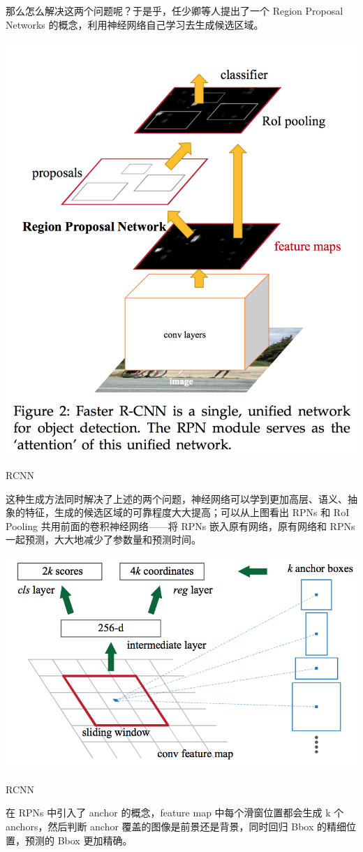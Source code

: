 那么怎么解决这两个问题呢？于是乎，任少卿等人提出了一个 Region Proposal Networks 的概念，利用神经网络自己学习去生成候选区域。
\begin{uscfigure}
	\includegraphics[width=\textwidth]{./Pictures/faster_rcnn.png}	
	\caption{RCNN}	
\end{uscfigure}
这种生成方法同时解决了上述的两个问题，神经网络可以学到更加高层、语义、抽象的特征，生成的候选区域的可靠程度大大提高；可以从上图看出 RPNs 和 RoI Pooling 共用前面的卷积神经网络——将 RPNs 嵌入原有网络，原有网络和 RPNs 一起预测，大大地减少了参数量和预测时间。
\begin{uscfigure}
	\includegraphics[width=\textwidth]{./Pictures/faster_rcnn_anchor.png}	
	\caption{RCNN}	
\end{uscfigure}
在 RPNs 中引入了 anchor 的概念，feature map 中每个滑窗位置都会生成 k 个 anchors，然后判断 anchor 覆盖的图像是前景还是背景，同时回归 Bbox 的精细位置，预测的 Bbox 更加精确。
